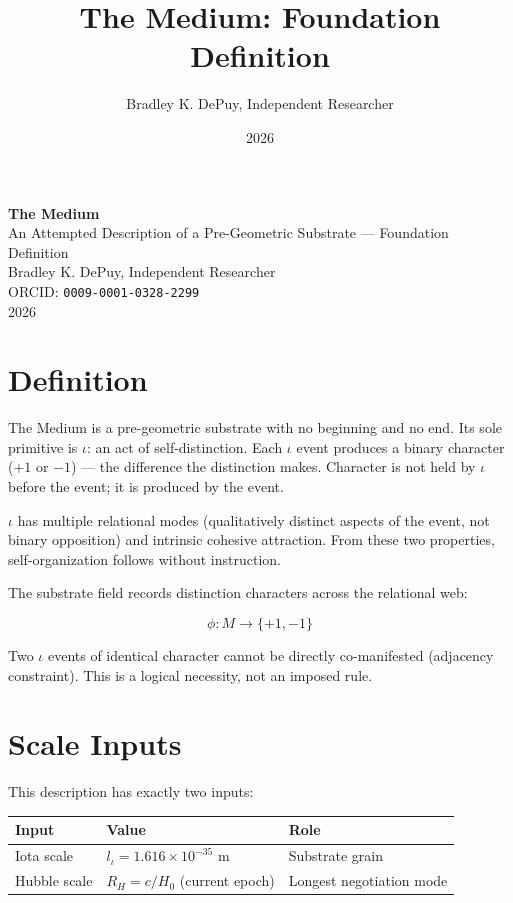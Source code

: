 \documentclass[11pt,letterpaper]{article}
\author{Bradley K. DePuy, Independent Researcher}
\date{2026}
\title{The Medium: Foundation Definition}
\begin{document}
\pagestyle{plain}
\begin{titlepage}
\vspace*{4cm}
\begin{center}
  {\LARGE\bfseries The Medium}\\[0.6em]
  {\large An Attempted Description of a Pre-Geometric Substrate --- Foundation Definition}\\[2.5em]
  {\normalsize Bradley K. DePuy, Independent Researcher}\\[0.5em]
  {\normalsize ORCID: \mbox{\texttt{0009-0001-0328-2299}}}\\[0.5em]
  {\normalsize 2026}
\end{center}
\end{titlepage}
\pagestyle{body}

\section{Definition}
\label{sec:org4685efa}

The Medium is a pre-geometric substrate with no beginning and no end. Its sole primitive is \(\iota\): an act of self-distinction. Each \(\iota\) event produces a binary character (\(+1\) or \(-1\)) --- the difference the distinction makes. Character is not held by \(\iota\) before the event; it is produced by the event.

\(\iota\) has multiple relational modes (qualitatively distinct aspects of the event, not binary opposition) and intrinsic cohesive attraction. From these two properties, self-organization follows without instruction.

The substrate field records distinction characters across the relational web:

\begin{equation}
\phi : M \to \{+1, -1\}
\end{equation}

Two \(\iota\) events of identical character cannot be directly co-manifested (adjacency constraint). This is a logical necessity, not an imposed rule.

\section{Scale Inputs}
\label{sec:org354e8d4}

This description has exactly two inputs:

\begin{center}
\begin{tabular}{lll}
\toprule
\textbf{Input} & \textbf{Value} & \textbf{Role}\\[0pt]
\midrule
Iota scale & \(l_\iota = 1.616 \times 10^{-35}\) m & Substrate grain\\[0pt]
Hubble scale & \(R_H = c/H_0\) (current epoch) & Longest negotiation mode\\[0pt]
\bottomrule
\end{tabular}
\end{center}
\end{document}
